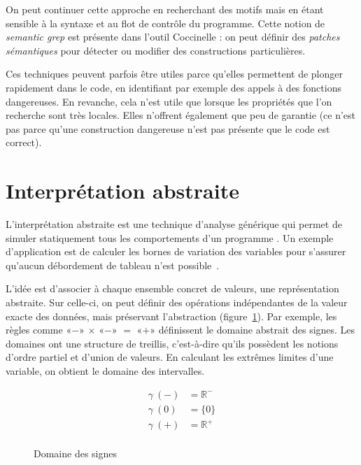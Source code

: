 On peut continuer cette approche en recherchant des motifs mais en étant
sensible à la syntaxe et au flot de contrôle du programme. Cette notion de
\emph{semantic grep} est présente dans l'outil Coccinelle
\cite{coccinelle09,coccinelle11}: on peut définir des
\emph{patches sémantiques} pour détecter ou modifier des constructions
particulières.

Ces techniques peuvent parfois être utiles parce qu'elles permettent de plonger
rapidement dans le code, en identifiant par exemple des appels à des fonctions
dangereuses. En revanche, cela n'est utile que lorsque les propriétés que l'on
recherche sont très locales. Elles n'offrent également que peu de garantie (ce
n'est pas parce qu'une construction dangereuse n'est pas présente que le code
est correct).

\section{Interprétation abstraite}
\label{sec:absint}

L'interprétation abstraite est une technique d'analyse générique qui permet de
simuler statiquement tous les comportements d'un programme
\cite{Cousot77,Cousot92-1}. Un exemple d'application est de calculer les bornes
de variation des variables pour s'assurer qu'aucun débordement de tableau n'est
possible~\cite{AllamigeonHymansSSTIC07}.

L'idée est d'associer à chaque ensemble concret de valeurs, une représentation
abstraite. Sur celle-ci, on peut définir des opérations indépendantes de la
valeur exacte des données, mais préservant l'abstraction
(figure~\ref{fig:dom-sig}). Par exemple, les règles comme
«$-$» $×$ «$-$» $=$ «$+$»
définissent le domaine abstrait des signes. Les domaines ont une structure de
treillis, c'est-à-dire qu'ils possèdent les notions d'ordre partiel et d'union
de valeurs. En calculant les extrêmes limites d'une variable, on obtient le
domaine des intervalles.

\begin{figure}[h]%
\centering

\begin{minipage}{0.4\textwidth}
\end{minipage}
\begin{minipage}{0.4\textwidth}
  \begin{align*}
  γ~(-) &= ℝ^- \\
  γ~(0) &= \{0\} \\
  γ~(+) &= ℝ^+ \\
  \end{align*}
\end{minipage}

\caption{Domaine des signes}
\label{fig:dom-sig}
\end{figure}%

